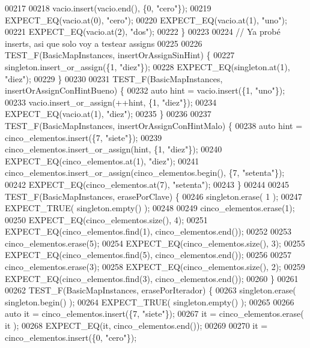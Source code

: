 \begin{DoxyCode}
00217 
00218     vacio.insert(vacio.end(), \{0, \textcolor{stringliteral}{"cero"}\});
00219     EXPECT\_EQ(vacio.at(0), \textcolor{stringliteral}{"cero"});
00220     EXPECT\_EQ(vacio.at(1), \textcolor{stringliteral}{"uno"});
00221     EXPECT\_EQ(vacio.at(2), \textcolor{stringliteral}{"dos"});
00222 \}
00223 
00224 \textcolor{comment}{// Ya probé inserts, asi que solo voy a testear assigns}
00225 
00226 TEST\_F(BasicMapInstances, insertOrAssignSinHint) \{
00227     singleton.insert\_or\_assign(\{1, \textcolor{stringliteral}{"diez"}\});
00228     EXPECT\_EQ(singleton.at(1), \textcolor{stringliteral}{"diez"});
00229 \}
00230 
00231 TEST\_F(BasicMapInstances, insertOrAssignConHintBueno) \{
00232     \textcolor{keyword}{auto} hint = vacio.insert(\{1, \textcolor{stringliteral}{"uno"}\});
00233     vacio.insert\_or\_assign(++hint, \{1, \textcolor{stringliteral}{"diez"}\});
00234     EXPECT\_EQ(vacio.at(1), \textcolor{stringliteral}{"diez"});
00235 \}
00236 
00237 TEST\_F(BasicMapInstances, insertOrAssignConHintMalo) \{
00238     \textcolor{keyword}{auto} hint = cinco\_elementos.insert(\{7, \textcolor{stringliteral}{"siete"}\});
00239     cinco\_elementos.insert\_or\_assign(hint, \{1, \textcolor{stringliteral}{"diez"}\});
00240     EXPECT\_EQ(cinco\_elementos.at(1), \textcolor{stringliteral}{"diez"});
00241     cinco\_elementos.insert\_or\_assign(cinco\_elementos.begin(), \{7, \textcolor{stringliteral}{"setenta"}\});
00242     EXPECT\_EQ(cinco\_elementos.at(7), \textcolor{stringliteral}{"setenta"});
00243 \}
00244 
00245 TEST\_F(BasicMapInstances, erasePorClave) \{
00246     singleton.erase( 1 );
00247     EXPECT\_TRUE( singleton.empty() );
00248 
00249     cinco\_elementos.erase(1);
00250     EXPECT\_EQ(cinco\_elementos.size(), 4);
00251     EXPECT\_EQ(cinco\_elementos.find(1), cinco\_elementos.end());
00252 
00253     cinco\_elementos.erase(5);
00254     EXPECT\_EQ(cinco\_elementos.size(), 3);
00255     EXPECT\_EQ(cinco\_elementos.find(5), cinco\_elementos.end());
00256 
00257     cinco\_elementos.erase(3);
00258     EXPECT\_EQ(cinco\_elementos.size(), 2);
00259     EXPECT\_EQ(cinco\_elementos.find(3), cinco\_elementos.end());
00260 \}
00261 
00262 TEST\_F(BasicMapInstances, erasePorIterador) \{
00263     singleton.erase( singleton.begin() );
00264     EXPECT\_TRUE( singleton.empty() );
00265 
00266     \textcolor{keyword}{auto} it = cinco\_elementos.insert(\{7, \textcolor{stringliteral}{"siete"}\});
00267     it = cinco\_elementos.erase( it );
00268     EXPECT\_EQ(it, cinco\_elementos.end());
00269 
00270     it = cinco\_elementos.insert(\{0, \textcolor{stringliteral}{"cero"}\});

\end{DoxyCode}
